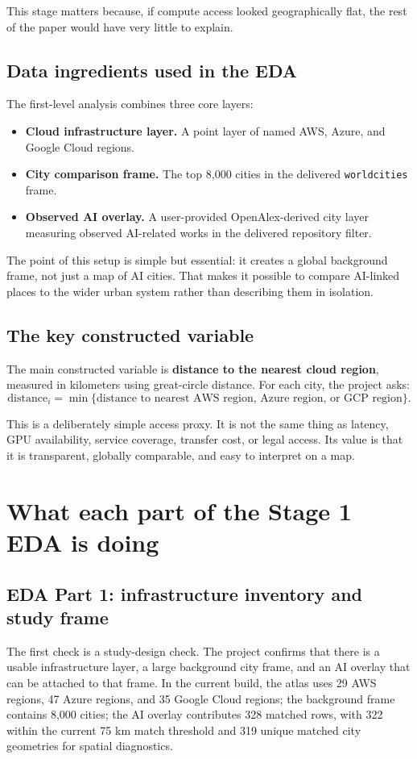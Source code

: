 \documentclass[11pt]{article}
\begin{document}
This stage matters because, if compute access looked geographically flat, the rest of the paper would have very little to explain.

\subsection{Data ingredients used in the EDA}
The first-level analysis combines three core layers:
\begin{itemize}[leftmargin=*]
    \item \textbf{Cloud infrastructure layer.} A point layer of named AWS, Azure, and Google Cloud regions.
    \item \textbf{City comparison frame.} The top 8{,}000 cities in the delivered \texttt{worldcities} frame.
    \item \textbf{Observed AI overlay.} A user-provided OpenAlex-derived city layer measuring observed AI-related works in the delivered repository filter.
\end{itemize}

The point of this setup is simple but essential: it creates a global background frame, not just a map of AI cities. That makes it possible to compare AI-linked places to the wider urban system rather than describing them in isolation.

\subsection{The key constructed variable}
The main constructed variable is \textbf{distance to the nearest cloud region}, measured in kilometers using great-circle distance. For each city, the project asks:
\[
\text{distance}_i = \min\{\text{distance to nearest AWS region, Azure region, or GCP region}\}.
\]

This is a deliberately simple access proxy. It is not the same thing as latency, GPU availability, service coverage, transfer cost, or legal access. Its value is that it is transparent, globally comparable, and easy to interpret on a map.

\section{What each part of the Stage 1 EDA is doing}

\subsection{EDA Part 1: infrastructure inventory and study frame}
The first check is a study-design check. The project confirms that there is a usable infrastructure layer, a large background city frame, and an AI overlay that can be attached to that frame. In the current build, the atlas uses 29 AWS regions, 47 Azure regions, and 35 Google Cloud regions; the background frame contains 8{,}000 cities; the AI overlay contributes 328 matched rows, with 322 within the current 75 km match threshold and 319 unique matched city geometries for spatial diagnostics.
\end{document}
